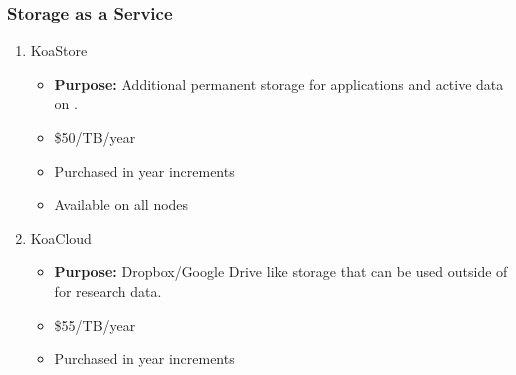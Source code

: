 \begin{frame}
  \frametitle{Storage as a Service}
  \begin{enumerate}
    \item KoaStore
      \begin{itemize}
      \item \textbf{{Purpose:}} Additional permanent storage for applications and active data on {\mana}.
			\item \$50/TB/year
			\item Purchased in year increments
			\item Available on all nodes
      \end{itemize}
    \item KoaCloud
      \begin{itemize}
      \item \textbf{{Purpose:}} Dropbox/Google Drive like storage that can be used outside of {\mana} for research data.
			\item \$55/TB/year
			\item Purchased in year increments
      \end{itemize}
  \end{enumerate}
\end{frame}


